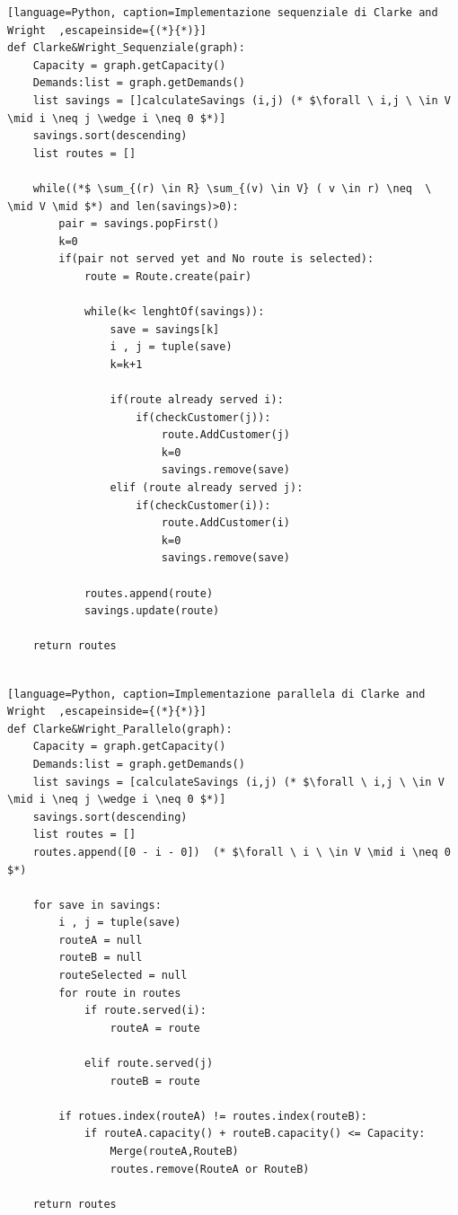 \documentclass[]{article}
\begin{document}
\begin{lstlisting}[language=Python, caption=Implementazione sequenziale di Clarke and Wright  ,escapeinside={(*}{*)}]
def Clarke&Wright_Sequenziale(graph):
	Capacity = graph.getCapacity()
	Demands:list = graph.getDemands()
	list savings = []calculateSavings (i,j) (* $\forall \ i,j \ \in V \mid i \neq j \wedge i \neq 0 $*)]
	savings.sort(descending)
	list routes = []
	
	while((*$ \sum_{(r) \in R} \sum_{(v) \in V} ( v \in r) \neq  \ \mid V \mid $*) and len(savings)>0):
		pair = savings.popFirst()
		k=0
		if(pair not served yet and No route is selected):
			route = Route.create(pair)
			
			while(k< lenghtOf(savings)):
				save = savings[k]
				i , j = tuple(save)
				k=k+1
				
				if(route already served i):
					if(checkCustomer(j)):
						route.AddCustomer(j)
						k=0
						savings.remove(save)							
				elif (route already served j):
					if(checkCustomer(i)):
						route.AddCustomer(i)
						k=0
						savings.remove(save)				
					
			routes.append(route)
			savings.update(route)
					
	return routes	
				
\end{lstlisting}


\begin{lstlisting}[language=Python, caption=Implementazione parallela di Clarke and Wright  ,escapeinside={(*}{*)}]
def Clarke&Wright_Parallelo(graph):
	Capacity = graph.getCapacity()
	Demands:list = graph.getDemands()
	list savings = [calculateSavings (i,j) (* $\forall \ i,j \ \in V \mid i \neq j \wedge i \neq 0 $*)]
	savings.sort(descending)
	list routes = []
	routes.append([0 - i - 0])  (* $\forall \ i \ \in V \mid i \neq 0 $*) 
	
	for save in savings:
		i , j = tuple(save)
		routeA = null
		routeB = null
		routeSelected = null
		for route in routes
			if route.served(i):
				routeA = route

			elif route.served(j)
				routeB = route
					    
		if rotues.index(routeA) != routes.index(routeB):
			if routeA.capacity() + routeB.capacity() <= Capacity:
				Merge(routeA,RouteB) 
				routes.remove(RouteA or RouteB)
				
	return routes
\end{lstlisting}
\end{document}
